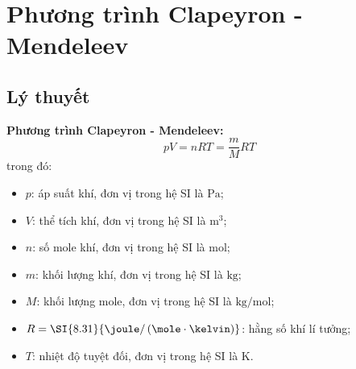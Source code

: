 \let\lesson\undefined
\newcommand{\lesson}{\phantomlesson{Bài 7: Phương trình trạng thái của khí lí tưởng}}
\chapter[Phương trình Clapeyron - Mendeleev]{Phương trình Clapeyron - Mendeleev}
\section{Lý thuyết}
\textbf{Phương trình Clapeyron - Mendeleev:}
$$pV=n RT=\dfrac{m}{M}RT$$
trong đó:
\begin{itemize}
	\item $p$: áp suất khí, đơn vị trong hệ SI là $\si{\pascal}$;
	\item $V$: thể tích khí, đơn vị trong hệ SI là $\si{\meter^3}$;
	\item $n$: số mole khí, đơn vị trong hệ SI là $\si{\mole}$;
	\item $m$: khối lượng khí, đơn vị trong hệ SI là $\si{\kilo\gram}$;
	\item $M$: khối lượng mole, đơn vị trong hệ SI là $\si{\kilo\gram/\mole}$;
	\item $R=\SI{8.31}{\joule/\left(\mole\cdot\kelvin\right)}$: hằng số khí lí tưởng;
	\item $T$: nhiệt độ tuyệt đối, đơn vị trong hệ SI là $\si{\kelvin}$.
	
\end{itemize}
